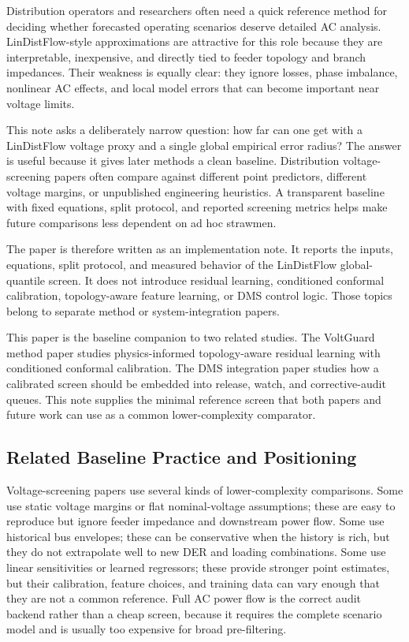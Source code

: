 \documentclass[
  journal]{IEEEtran}
\begin{document}
Distribution operators and researchers often need a quick reference
method for deciding whether forecasted operating scenarios deserve
detailed AC analysis. LinDistFlow-style approximations are attractive
for this role because they are interpretable, inexpensive, and directly
tied to feeder topology and branch impedances. Their weakness is equally
clear: they ignore losses, phase imbalance, nonlinear AC effects, and
local model errors that can become important near voltage limits.

This note asks a deliberately narrow question: how far can one get with
a LinDistFlow voltage proxy and a single global empirical error radius?
The answer is useful because it gives later methods a clean baseline.
Distribution voltage-screening papers often compare against different
point predictors, different voltage margins, or unpublished engineering
heuristics. A transparent baseline with fixed equations, split protocol,
and reported screening metrics helps make future comparisons less
dependent on ad hoc strawmen.

The paper is therefore written as an implementation note. It reports the
inputs, equations, split protocol, and measured behavior of the
LinDistFlow global-quantile screen. It does not introduce residual
learning, conditioned conformal calibration, topology-aware feature
learning, or DMS control logic. Those topics belong to separate method
or system-integration papers.

This paper is the baseline companion to two related studies. The
VoltGuard method paper studies physics-informed topology-aware residual
learning with conditioned conformal calibration. The DMS integration
paper studies how a calibrated screen should be embedded into release,
watch, and corrective-audit queues. This note supplies the minimal
reference screen that both papers and future work can use as a common
lower-complexity comparator.

\subsection{Related Baseline Practice and
Positioning}\label{related-baseline-practice-and-positioning}

Voltage-screening papers use several kinds of lower-complexity
comparisons. Some use static voltage margins or flat nominal-voltage
assumptions; these are easy to reproduce but ignore feeder impedance and
downstream power flow. Some use historical bus envelopes; these can be
conservative when the history is rich, but they do not extrapolate well
to new DER and loading combinations. Some use linear sensitivities or
learned regressors; these provide stronger point estimates, but their
calibration, feature choices, and training data can vary enough that
they are not a common reference. Full AC power flow is the correct audit
backend rather than a cheap screen, because it requires the complete
scenario model and is usually too expensive for broad pre-filtering.
\end{document}
